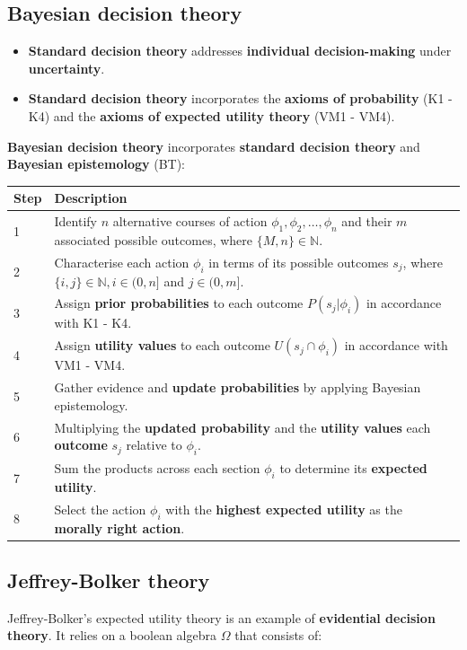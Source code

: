 \documentclass[11pt]{article}
\begin{document}
 \newpage
\subsection{Bayesian decision theory}
\label{sec:orge285a63}
\begin{itemize}
\item \textbf{Standard decision theory} addresses \textbf{individual decision-making} under \textbf{uncertainty}.
\item \textbf{Standard decision theory} incorporates the \textbf{axioms of probability} (K1 - K4) and the \textbf{axioms of expected utility theory} (VM1 - VM4).
\end{itemize}

\textbf{Bayesian decision theory} incorporates \textbf{standard decision theory} and \textbf{Bayesian epistemology} (BT):
\begin{center}
\begin{tabular}{|m{2em}|m{28em}|}
\hline
Step & Description\\
\hline
1 & Identify \(n\) alternative courses of action \(\phi_1, \phi_2, \ldots, \phi_n\) and their \(m\) associated possible outcomes, where \(\{M, n\} \in \mathbb{N}\).\\
\hline
2 & Characterise each action \(\phi_i\) in terms of its possible outcomes \(s_j\), where \(\{i, j\} \in \mathbb{N}, i \in (0, n]\) and \(j \in (0, m]\).\\
\hline
3 & Assign \textbf{prior probabilities} to each outcome \(P(s_j \vert \phi_i)\) in accordance with K1 - K4.\\
\hline
4 & Assign \textbf{utility values} to each outcome \(U(s_j \cap \phi_i)\) in accordance with VM1 - VM4.\\
\hline
5 & Gather evidence and \textbf{update probabilities} by applying Bayesian epistemology.\\
\hline
6 & Multiplying the \textbf{updated probability} and the \textbf{utility values} each \textbf{outcome} \(s_j\) relative to \(\phi_i\).\\
\hline
7 & Sum the products across each section \(\phi_i\) to determine its \textbf{expected utility}.\\
\hline
8 & Select the action \(\phi_i\) with the \textbf{highest expected utility} as the \textbf{morally right action}.\\
\hline
\end{tabular}
\end{center}
\subsection{Jeffrey-Bolker theory}
\label{sec:org3a9986d}
Jeffrey-Bolker's expected utility theory is an example of \textbf{evidential decision theory}. It relies on a boolean algebra \(\Omega\) that consists of:
\end{document}
